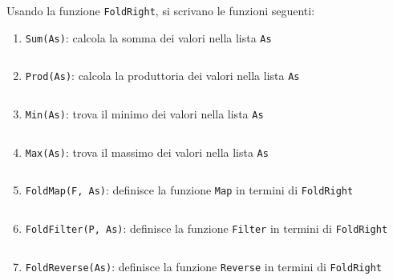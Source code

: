 \documentclass[11pt,a4]{article}
\newcommand{\mybox}[2]{$\quad$\fbox{
\begin{minipage}{#1cm}
\hfill\vspace{#2cm}
\end{minipage}
}}
\begin{document}
\begin{enumerate}
Usando la funzione {\tt FoldRight}, si scrivano le funzioni seguenti:

\begin{enumerate}
\item {\tt Sum(As)}: calcola la somma dei valori nella lista {\tt As}

\mybox{15}{2.0}

\item {\tt Prod(As)}: calcola la produttoria dei valori nella lista {\tt As}

\mybox{15}{2.0}

\item {\tt Min(As)}: trova il minimo dei valori nella lista {\tt As}

\mybox{15}{2.0}

\item {\tt Max(As)}: trova il massimo dei valori nella lista {\tt As}

\mybox{15}{2.0}

\item {\tt FoldMap(F, As)}: definisce la funzione {\tt Map} in termini di {\tt FoldRight}

\mybox{15}{2.0}

\item {\tt FoldFilter(P, As)}: definisce la funzione {\tt Filter} in termini di {\tt FoldRight}

\mybox{15}{2.0}

\item {\tt FoldReverse(As)}: definisce la funzione {\tt Reverse} in termini di {\tt FoldRight}

\mybox{15}{2.0}

\end{enumerate}


\end{enumerate}
\end{document}
